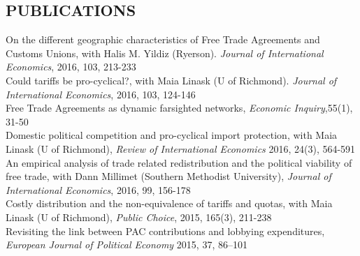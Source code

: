 \documentclass[11pt]{res}
\begin{document}
\begin{resume}
\section{PUBLICATIONS}\vspace{1.5mm}
{On the different geographic characteristics of Free Trade Agreements and Customs Unions}, with Halis M. Yildiz (Ryerson). \emph{Journal of International Economics}, 2016, 103, 213-233 \vspace{1.5mm}\\
{Could tariffs be pro-cyclical?}, with Maia Linask (U of Richmond). \emph{Journal of International Economics}, 2016, 103, 124-146 \vspace{1.5mm}\\
{ Free Trade Agreements as dynamic farsighted networks}, \emph{Economic Inquiry},55(1), 31-50\vspace{1.5mm}\\
{Domestic political competition and pro-cyclical import protection}, with Maia Linask (U of Richmond), \emph{Review of International Economics} 2016, 24(3), 564-591\vspace{1.5mm}\\
{An empirical analysis of trade related redistribution and the political viability of free trade}, with Dann Millimet (Southern Methodist University), \emph{Journal of International Economics}, 2016, 99, 156-178 \vspace{1.5mm}\\
{Costly distribution and the non-equivalence of tariffs and quotas}, with Maia Linask (U of Richmond), \emph{Public Choice}, 2015, 165(3), 211-238 \vspace{1.5mm}\\
{Revisiting the link between PAC contributions and lobbying expenditures, \emph{European Journal of Political Economy}} 2015, 37, 86--101 \vspace{5mm}\\


\phantom{.}\vspace{0.5cm}

\end{resume}
\end{document}
